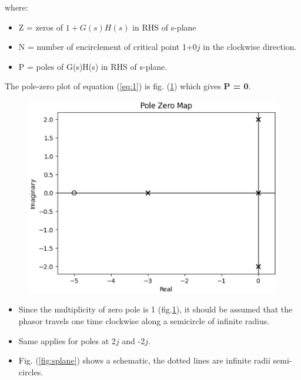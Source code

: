 where:
\begin{itemize}
    \item  Z = zeros of $ {1+G(s)H(s)}$  in RHS of s-plane 
\end{itemize}
\begin{itemize}
    \item N = number of encirclement of critical point 1+0$j$ in the clockwise direction.
    \item P = poles of G(s)H(s) in RHS of s-plane.
\end{itemize}
The pole-zero plot of equation (\ref{eq:1}) is fig. (\ref{fig:pz}) which gives \textbf{P = 0}.
\begin{figure}[ht!]
        \includegraphics[width=\columnwidth]{./figs/ee18btech11025/pzG.eps}
        \caption{}
        \label{fig:pz}
\end{figure}
\begin{itemize} \label{skjvn}
    \item Since the multiplicity of zero pole is 1 (fig.\ref{fig:pz}), it should be assumed that the phasor travels one time clockwise along a semicircle of infinite radius.
    \item Same applies for poles at 2$j$ and -2$j$.
    \item Fig. (\ref{fig:splane}) shows a schematic, the dotted lines are infinite radii semi-circles.
\end{itemize}

